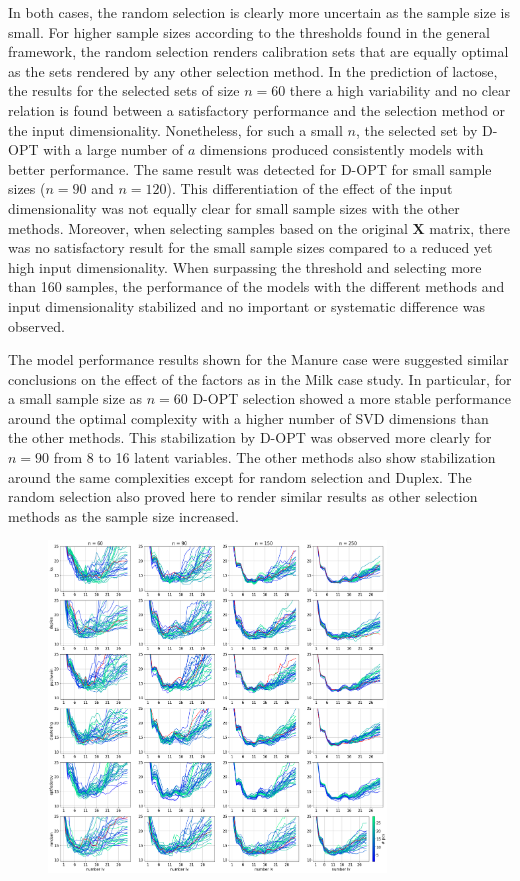 \documentclass[journal=ancham,manuscript=article]{achemso}
\begin{document}
In both cases, the random selection is clearly more uncertain as the sample size is small. For higher sample sizes according to the thresholds found in the general framework, the random selection renders calibration sets that are equally optimal as the sets rendered by any other selection method. In the prediction of lactose, the results for the selected sets of size $n=60$ there a high variability and no clear relation is found between a satisfactory performance and the selection method or the input dimensionality. Nonetheless, for such a small $n$, the selected set by D-OPT with a large number of $a$ dimensions produced consistently models with better performance. The same result was detected for D-OPT for small sample sizes ($n=90$ and $n=120$). This differentiation of the effect of the input dimensionality was not equally clear for small sample sizes with the other methods. Moreover, when selecting samples based on the original $\mathbf{X}$ matrix, there was no satisfactory result for the small sample sizes compared to a reduced yet high input dimensionality. When surpassing the threshold and selecting more than 160 samples, the performance of the models with the different methods and input dimensionality stabilized and no important or systematic difference was observed.

The model performance results shown for the Manure case were suggested similar conclusions on the effect of the factors as in the Milk case study. In particular, for a small sample size as $n=60$ D-OPT selection showed a more stable performance  around the optimal complexity with a higher number of SVD dimensions than the other methods. This stabilization by D-OPT was observed more clearly for $n=90$ from 8 to 16 latent variables. The other methods also show stabilization around the same complexities except for random selection and Duplex. The random selection also proved here to render similar results as other selection methods as the sample size increased.




\begin{figure}[b]
\includegraphics[width=0.8\textwidth]{manuscript/figures/d02_manure_model_performance.png}
\centering
\caption{}
\label{fig_d02_manure_model_performance}
\end{figure}
\end{document}
